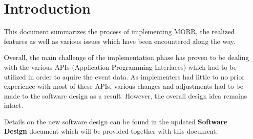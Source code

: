 \chapter{Introduction}

This document summarizes the process of implementing MORR, the realized features
as well as various issues which have been encountered along the way.

Overall, the main challenge of the implementation phase has proven to be
dealing with the various APIs (Application Programming Interfaces) which had to be
utilized in order to aquire the event data. As implementers had little to no
prior experience with most of these APIs, various changes and adjustments had to be made
to the software design as a result. However, the overall design idea remains intact.

Details on the new software design can be found in the updated \textbf{Software Design} document
which will be provided together with this document.